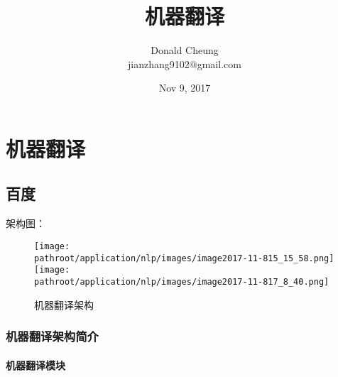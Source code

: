 \documentclass[10pt,a4paper]{ctexbook}
\providecommand{\pathroot}{../..}
\begin{document}
    \setlength{\baselineskip}{20pt}
    \title{机器翻译}
    \author{Donald Cheung\\jianzhang9102@gmail.com}
    \date{Nov 9, 2017}
    \maketitle
    \tableofcontents
\fi

\chapter{机器翻译}


\section{百度}
架构图：

\begin{figure}[ht]
    \centering
    \texttt{[image: \\pathroot/application/nlp/images/image2017-11-815\_15\_58.png]}
    \texttt{[image: \\pathroot/application/nlp/images/image2017-11-817\_8\_40.png]}
    \caption{机器翻译架构}
    \label{fig:baidu-mt-arch}
\end{figure}

\subsection{机器翻译架构简介}
\subsubsection{机器翻译模块}
\end{document}
